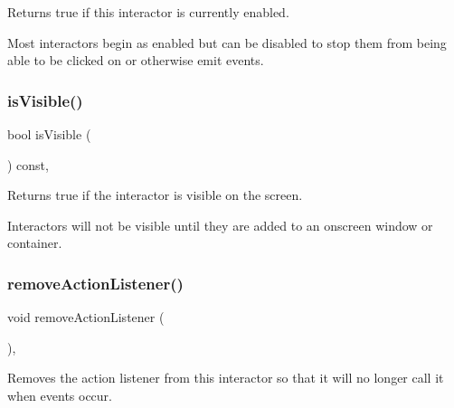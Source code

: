 Returns true if this interactor is currently enabled. 

Most interactors begin as enabled but can be disabled to stop them from being able to be clicked on or otherwise emit events. \mbox{\label{classsgl_1_1GInteractor_a9d8a6cfb13917785c143e74d40e4e2be}} 
\subsubsection{\texorpdfstring{is\+Visible()}{isVisible()}}
{\footnotesize\ttfamily bool is\+Visible (\begin{DoxyParamCaption}{ }\end{DoxyParamCaption}) const\hspace{0.3cm}{\ttfamily [virtual]}, {\ttfamily [inherited]}}



Returns true if the interactor is visible on the screen. 

Interactors will not be visible until they are added to an onscreen window or container. \mbox{\label{classsgl_1_1GInteractor_ab7fe7a876367b87cf7202f947f1d05e4}} 
\subsubsection{\texorpdfstring{remove\+Action\+Listener()}{removeActionListener()}}
{\footnotesize\ttfamily void remove\+Action\+Listener (\begin{DoxyParamCaption}{ }\end{DoxyParamCaption})\hspace{0.3cm}{\ttfamily [virtual]}, {\ttfamily [inherited]}}



Removes the action listener from this interactor so that it will no longer call it when events occur. 

\mbox{\label{classsgl_1_1GInteractor_ad39d0325cde6b97ebda4b9d7787c633b}} 
